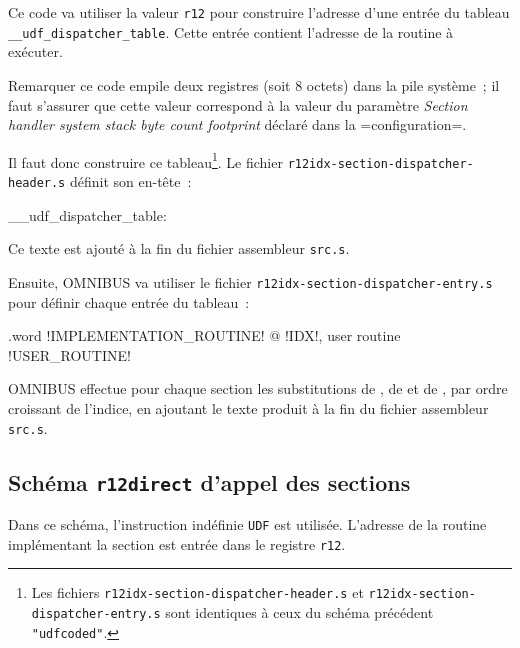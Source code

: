 Ce code va utiliser la valeur \texttt{r12} pour construire l'adresse d'une entrée du tableau \texttt{\_\_udf\_dispatcher\_table}. Cette entrée contient l'adresse de la routine à exécuter.

Remarquer ce code empile deux registres (soit 8 octets) dans la pile système~; il faut s'assurer que cette valeur correspond à la valeur du paramètre \emph{Section handler system stack byte count footprint} déclaré dans la \omnibus=configuration=.

Il faut donc construire ce tableau\footnote{Les fichiers \texttt{r12idx-section-dispatcher-header.s} et \texttt{r12idx-section-dispatcher-entry.s} sont identiques à ceux du schéma précédent \texttt{"udfcoded"}.}. Le fichier \texttt{r12idx-section-dispatcher-header.s} définit son en-tête~:

\begin{SHELL}\small
\_\_udf\_dispatcher\_table:
\end{SHELL}

Ce texte est ajouté à la fin du fichier assembleur \texttt{src.s}.

Ensuite, OMNIBUS va utiliser le fichier \texttt{r12idx-section-dispatcher-entry.s} pour définir chaque entrée du tableau~:
\begin{SHELL}\small
\hspace*{1.2em}.word !IMPLEMENTATION\_ROUTINE! @ !IDX!, user routine !USER\_ROUTINE!

\end{SHELL}

OMNIBUS effectue pour chaque section les substitutions de , de  et de , par ordre croissant de l'indice, en ajoutant le texte produit à la fin du fichier assembleur \texttt{src.s}.











\subsection{Schéma \texttt{r12direct} d'appel des sections}

Dans ce schéma, l'instruction indéfinie \texttt{UDF} est utilisée. L'adresse de la routine implémentant la section est entrée dans le registre \texttt{r12}.

